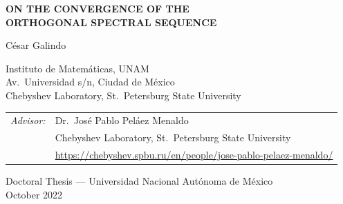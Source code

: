 \documentclass[12pt,a4paper]{article}
\theoremstyle{definition}
\begin{document}
\thispagestyle{empty}

\begin{center}

\vspace*{1.5cm}

{\Large\bfseries
ON THE CONVERGENCE OF THE\\[4pt]
ORTHOGONAL SPECTRAL SEQUENCE
}

\vspace{1.8cm}

{\large César Galindo}

\vspace{0.4cm}

{\normalsize
Instituto de Matemáticas, UNAM\\
Av.\ Universidad s/n, Ciudad de México\\
Chebyshev Laboratory, St.\ Petersburg State University
}

\vspace{2cm}

\begin{tabular}{rl}
\textit{Advisor:} &
Dr.\ José Pablo Peláez Menaldo \\[2pt]
& \small Chebyshev Laboratory, St.\ Petersburg State University \\[2pt]
& \small \url{https://chebyshev.spbu.ru/en/people/jose-pablo-pelaez-menaldo/} \\[8pt]
\end{tabular}

\vspace{2cm}

{\normalsize
Doctoral Thesis — Universidad Nacional Autónoma de México\\
October 2022
}

\end{center}

\newpage
\end{document}
